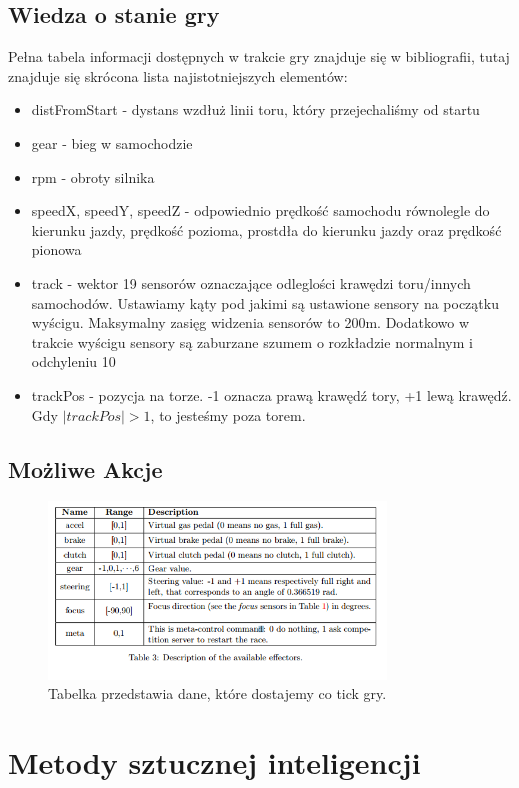 \documentclass{article}
\begin{document}
\subsection{Wiedza o stanie gry}
Pełna tabela informacji dostępnych w trakcie gry znajduje się w bibliografii, tutaj znajduje się skrócona lista najistotniejszych elementów:
\begin{itemize}
\item distFromStart - dystans wzdłuż linii toru, który przejechaliśmy od startu
\item gear - bieg w samochodzie
\item rpm - obroty silnika
\item speedX, speedY, speedZ - odpowiednio prędkość samochodu równolegle do kierunku jazdy,  prędkość pozioma, prostdła do kierunku jazdy oraz prędkość pionowa
\item track - wektor 19 sensorów oznaczające odleglości krawędzi toru/innych samochodów. Ustawiamy kąty pod jakimi są ustawione sensory na początku wyścigu. Maksymalny zasięg widzenia sensorów to 200m. Dodatkowo w trakcie wyścigu sensory są zaburzane szumem o rozkładzie normalnym i odchyleniu 10%
\item trackPos - pozycja na torze. -1 oznacza prawą krawędź tory, +1 lewą krawędź. Gdy \(|trackPos| > 1\), to jesteśmy poza torem.
\end{itemize}
\subsection{Możliwe Akcje}
\begin{figure}[H]
	\centering
    \includegraphics[width=0.8\textwidth]{inputs.png}
    \caption{Tabelka przedstawia dane, które dostajemy co tick gry.}
\end{figure}

\section{Metody sztucznej inteligencji}
\end{document}
